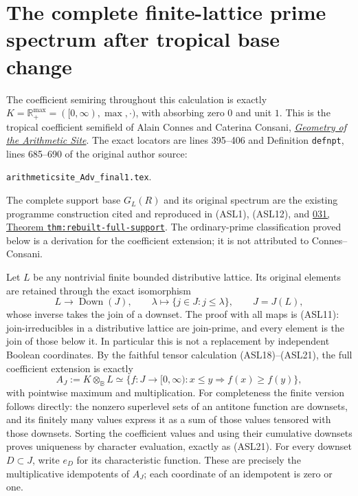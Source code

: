 \section{The complete finite-lattice prime spectrum after tropical base change}
\label{sec:tropical-lattice-prime-spectrum}

The coefficient semiring throughout this calculation is exactly
$K=\mathbb R_+^{\max}=([0,\infty),\max,\cdot)$, with absorbing
zero $0$ and unit $1$. This is the tropical coefficient semifield of
Alain Connes and Caterina Consani,
\href{https://arxiv.org/abs/1502.05580}{\emph{Geometry of the Arithmetic
Site}}. The exact locators are lines 395--406 and Definition
\texttt{defnpt}, lines 685--690 of the original author source:
\begin{center}
\nolinkurl{arithmeticsite_Adv_final1.tex}.
\end{center}
The complete support base $G_L(R)$ and its original spectrum are the
existing programme construction cited and reproduced in (ASL1),
(ASL12), and
\href{https://github.com/KokunoYumeto/zeta-function-research-reader/blob/3c78cfbd9e194d35117b33277c421c6564ce3dbf/workbenches/splitzero-tandem/continuations/20260923-full-prime-support/031/01_REBUILT_MATHEMATICS.tex}{031,
Theorem \texttt{thm:rebuilt-full-support}}.
The ordinary-prime classification proved below is a derivation for
the coefficient extension; it is not attributed to Connes--Consani.

Let $L$ be any nontrivial finite bounded distributive lattice.
Its original elements are retained through the exact isomorphism
\begin{equation}\tag{LSP1}
 L\longrightarrow\operatorname{Down}(J),\qquad
 \lambda\longmapsto\{j\in J:j\le\lambda\},
 \qquad J=J(L),
\end{equation}
whose inverse takes the join of a downset. The proof with all maps
is (ASL11): join-irreducibles in a distributive lattice are join-prime,
and every element is the join of those below it. In particular this
is not a replacement by independent Boolean coordinates. By the
faithful tensor calculation (ASL18)--(ASL21), the full coefficient
extension is exactly
\begin{equation}\tag{LSP2}
 A_J:=K\otimes_{\mathbb B}L
 \simeq\{f:J\to[0,\infty):x\le y\Longrightarrow f(x)\ge f(y)\},
\end{equation}
with pointwise maximum and multiplication. For completeness the
finite version follows directly: the nonzero superlevel sets of
an antitone function are downsets, and its finitely many values
express it as a sum of those values tensored with those downsets.
Sorting the coefficient values and using their cumulative downsets
proves uniqueness by character evaluation, exactly as (ASL21).
For every downset $D\subset J$, write $e_D$ for its characteristic
function. These are precisely the multiplicative idempotents of
$A_J$; each coordinate of an idempotent is zero or one.

